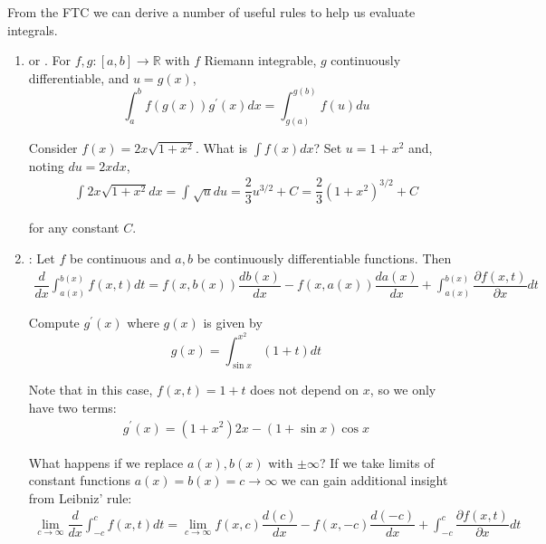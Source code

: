 \documentclass{article}
\begin{document}
From the FTC we can derive a number of useful rules to help us evaluate integrals.
\begin{enumerate}
  \item {} or . For $f, g: [a, b] \to \mathbb{R}$ with $f$ Riemann integrable, $g$ continuously differentiable, and $u = g(x)$,
    \[
      \int_{a}^{b} f(g(x)) g^\prime(x) dx
      =
      \int_{g(a)}^{g(b)} f(u) du
    \]

    \begin{example}
      Consider $f(x) = 2x \sqrt{1 + x^2}$. What is $\int f(x) dx$? Set $u = 1 + x^2$ and, noting $du = 2x dx$,
      \begin{align*}
        \int_{}^{} 2x \sqrt{1 + x^2} dx
        =
        \int_{}^{} \sqrt{u} du
        =
        \dfrac{2}{3} u^{3/2} + C
        =
        \dfrac{2}{3} \left(1 + x^2\right)^{3/2} + C
      \end{align*}

      for any constant $C$.
    \end{example}

  \item {}: Let $f$ be continuous and $a, b$ be continuously differentiable functions. Then
    \begin{align*}
      \dfrac{d}{dx} \int_{a(x)}^{b(x)} f(x, t) dt
      =
      f(x, b(x)) \dfrac{db(x)}{dx}
      -
      f(x, a(x)) \dfrac{da(x)}{dx}
      +
      \int_{a(x)}^{b(x)}
      \dfrac{\partial f(x, t)}{\partial x} dt
    \end{align*}

    \begin{example}
      Compute $g^\prime(x)$ where $g(x)$ is given by
      \[
        g(x) = \int_{\sin x}^{x^2} (1 + t) dt
      \]

      Note that in this case, $f(x, t) = 1 + t$ does not depend  on $x$, so we only have two terms:
      \begin{align*}
        g^\prime(x)
        =
        (1 + x^2) 2x
        -
        (1 + \sin x) \cos x
      \end{align*}
    \end{example}

    \begin{remark}
      What happens if we replace $a(x), b(x)$ with $\pm \infty$? If we take limits of constant functions $a(x) = b(x) = c \to \infty$ we can gain additional insight from Leibniz' rule:
    \begin{align*}
      \lim_{c \to \infty}
      \dfrac{d}{dx} \int_{-c}^{c} f(x, t) dt
      =
      \lim_{c \to \infty}
      f(x, c) \dfrac{d (c)}{dx}
      -
      f(x, -c) \dfrac{d (-c)}{dx}
      +
      \int_{-c}^{c}
      \dfrac{\partial f(x, t)}{\partial x} dt
    \end{align*}


\end{remark}
\end{enumerate}
\end{document}
